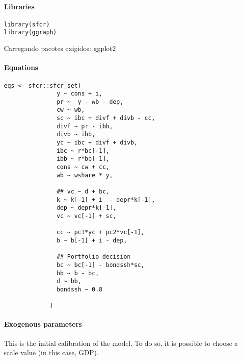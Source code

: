 \documentclass[11pt]{article}
\begin{document}
\paragraph*{Libraries}
\label{sec:orgbae0673}

\begin{verbatim}
library(sfcr)
library(ggraph)
\end{verbatim}

Carregando pacotes exigidos: ggplot2

\paragraph*{Equations}
\label{sec:orgfa94973}

\begin{verbatim}
eqs <- sfcr::sfcr_set(
               y ~ cons + i,
               pr ~  y - wb - dep,
               cw ~ wb,
               sc ~ ibc + divf + divb - cc,
               divf ~ pr - ibb,
               divb ~ ibb,
               yc ~ ibc + divf + divb,
               ibc ~ r*bc[-1],
               ibb ~ r*bb[-1],
               cons ~ cw + cc,
               wb ~ wshare * y,

               ## vc ~ d + bc,
               k ~ k[-1] + i  - depr*k[-1],
               dep ~ depr*k[-1],
               vc ~ vc[-1] + sc,

               cc ~ pc1*yc + pc2*vc[-1],
               b ~ b[-1] + i - dep,

               ## Portfolio decision
               bc ~ bc[-1] - bondssh*sc,
               bb ~ b - bc,
               d ~ bb,
               bondssh ~ 0.8

             )
\end{verbatim}

\paragraph*{Exogenous parameters}
\label{sec:org50837d9}

This is the initial calibration of the model.
To do so, it is possible to choose a scale value (in this case, GDP).
\end{document}
